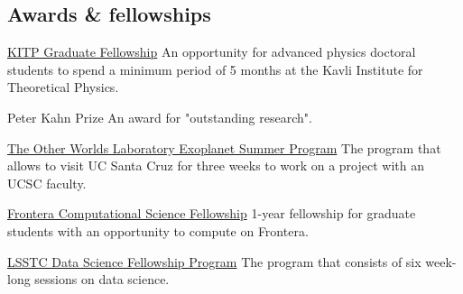 \documentclass[10pt]{article} %
\begin{document}
\begin{paracol}{1}


\section{Awards \& fellowships}





	
	{\href{https://www.kitp.ucsb.edu/apply/fellowships/graduate-fellowship-program}{KITP Graduate Fellowship}} %
	{An opportunity for advanced physics doctoral students to spend a minimum period of 5 months at the Kavli Institute for Theoretical Physics.} %

	{Peter Kahn Prize} %
	{An award for "outstanding research".} %

	{\href{https://owl.ucsc.edu/summer/}{The Other Worlds Laboratory Exoplanet Summer Program}} %
	{The program that allows to visit UC Santa Cruz for three weeks to work on a project with an UCSC faculty.} %

	{\href{https://frontera-portal.tacc.utexas.edu/fellowship/}{Frontera Computational Science Fellowship}} %
	{1-year fellowship for graduate students with an opportunity to compute on Frontera.} %

	{\href{https://www.lsstcorporation.org/fellowship_program}{LSSTC Data Science Fellowship Program}} %
	{The program that consists of six week-long sessions on data science.} %
	

\end{paracol}
\end{document}
